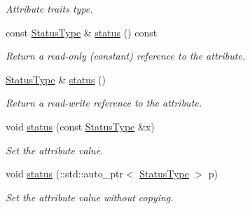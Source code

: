 \begin{DoxyCompactItemize}
\begin{DoxyCompactList}\small\item\em Attribute traits type. \item\end{DoxyCompactList}\item 
const \hyperlink{classopenstack_1_1xml_1_1VersionStatus}{StatusType} \& \hyperlink{classopenstack_1_1xml_1_1Version_ad8bb3cf4800c9a73c966b085210cdeac}{status} () const 
\begin{DoxyCompactList}\small\item\em Return a read-\/only (constant) reference to the attribute. \item\end{DoxyCompactList}\item 
\hyperlink{classopenstack_1_1xml_1_1VersionStatus}{StatusType} \& \hyperlink{classopenstack_1_1xml_1_1Version_ae8a18322c821f8a575480764c4c49f68}{status} ()
\begin{DoxyCompactList}\small\item\em Return a read-\/write reference to the attribute. \item\end{DoxyCompactList}\item 
void \hyperlink{classopenstack_1_1xml_1_1Version_a3c917ed6599f8d7f3c2d155cc2eb8eb2}{status} (const \hyperlink{classopenstack_1_1xml_1_1VersionStatus}{StatusType} \&x)
\begin{DoxyCompactList}\small\item\em Set the attribute value. \item\end{DoxyCompactList}\item 
void \hyperlink{classopenstack_1_1xml_1_1Version_a8d42fc00a24f1489b35f41059a180e6d}{status} (::std::auto\_\-ptr$<$ \hyperlink{classopenstack_1_1xml_1_1VersionStatus}{StatusType} $>$ p)
\begin{DoxyCompactList}\small\item\em Set the attribute value without copying. \item\end{DoxyCompactList}\end{DoxyCompactItemize}
